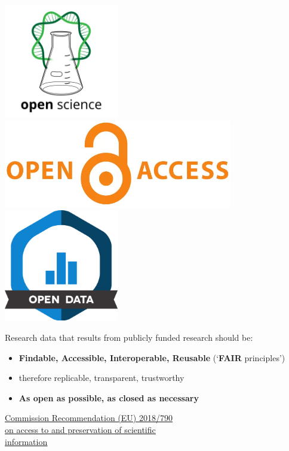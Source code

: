 \documentclass[a0,portrait]{a0poster}
\begin{document}
\begin{multicols}{3}
 \includegraphics[width=5cm]{Poster TEX/style/Open Science.png} 
 \hspace{\fill} 
 \includegraphics[width=10cm]{Poster TEX/style/Open access (4).png}
 \hspace{\fill} 
 \includegraphics[width=5cm]{Poster TEX/style/Open data.png}

Research data that results from publicly funded research should be:

\color{uzhockerrot100}
\begin{itemize}
\item \textbf{Findable, Accessible, Interoperable, Reusable} (‘\textbf{FAIR} principles’)
\color{black}
\item therefore replicable, transparent, trustworthy
\color{uzhockerrot100}
\item \textbf{As open as possible, as closed as necessary}
\end{itemize}
\color{black}

\href{https://eur-lex.europa.eu/legal-content/EN/TXT/?uri=CELEX%3A32018H0790&qid=1701691098601}{\color{blue}\underline{Commission Recommendation (EU) 2018/790}} \\
\href{https://eur-lex.europa.eu/legal-content/EN/TXT/?uri=CELEX%3A32018H0790&qid=1701691098601}{\color{blue}\underline{on access to and preservation of scientific}} \\
\href{https://eur-lex.europa.eu/legal-content/EN/TXT/?uri=CELEX%3A32018H0790&qid=1701691098601}{\color{blue}\underline{information}}


\end{multicols}
\end{document}
